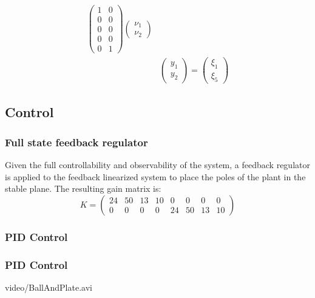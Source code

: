 \begin{frame}
\begin{equation}
\begin{aligned}
\begin{pmatrix}
	 		1 &0 \\
	 		0 &0 \\
	 		0 &0 \\
	 		0 &0 \\
	 		0 &1
	 	\end{pmatrix}
	 	\begin{pmatrix}
	 		\nu_1 \\ \nu_2
	 	\end{pmatrix}\\[6pt]
	 	&\begin{pmatrix}
	 		y_1\\ y_2
	 	\end{pmatrix}=%
	 	\begin{pmatrix}
	 		\xi_1\\ \xi_5
	 	\end{pmatrix}%
	\end{aligned}
\end{equation}
\end{frame}
%
\subsection{Control}
%
\begin{frame}
\frametitle{Full state feedback regulator}
Given the full controllability and observability of the system, a feedback regulator is applied to the feedback linearized system to place the poles of the plant in the stable plane. The resulting gain matrix is:
\begin{equation}
	K =%
	\begin{pmatrix}
		24 &50 &13 &10 &0 &0 &0 &0 \\
		0 &0 &0 &0 &24 &50 &13 &10
	\end{pmatrix}
\end{equation}
\end{frame}
\begin{frame}
\frametitle{PID Control}
\end{frame}
%
\begin{frame}
\frametitle{PID Control}
%
\begin{center}
	\movie[width=11cm,height=5.01cm,autostart,loop,poster,showcontrols=true]%
	{}%
	{video/BallAndPlate.avi}
\end{center}
\end{frame}